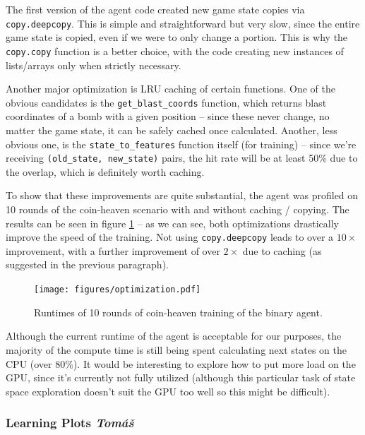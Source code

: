 \documentclass{article}
\begin{document}
The first version of the agent code created new game state copies via \texttt{copy.deepcopy}.
This is simple and straightforward but very slow, since the entire game state is copied, even if we were to only change a portion.
This is why the \texttt{copy.copy} function is a better choice, with the code creating new instances of lists/arrays only when strictly necessary.

Another major optimization is LRU caching of certain functions.
One of the obvious candidates is the \texttt{get\_blast\_coords} function, which returns blast coordinates of a bomb with a given position -- since these never change, no matter the game state, it can be safely cached once calculated.
Another, less obvious one, is the \texttt{state\_to\_features} function itself (for training) -- since we're receiving \texttt{(old\_state, new\_state)} pairs, the hit rate will be at least 50\% due to the overlap, which is definitely worth caching.

To show that these improvements are quite substantial, the agent was profiled on 10 rounds of the coin-heaven scenario with and without caching / copying.
The results can be seen in figure \ref{fig:optimization} -- as we can see, both optimizations drastically improve the speed of the training.
Not using \texttt{copy.deepcopy} leads to over a $10 \times$ improvement, with a further improvement of over $2 \times$ due to caching (as suggested in the previous paragraph).

\begin{figure}[h]
    \centering
    \texttt{[image: figures/optimization.pdf]}
    \caption{Runtimes of 10 rounds of coin-heaven training of the binary agent.}
    \label{fig:optimization}
\end{figure}

Although the current runtime of the agent is acceptable for our purposes, the majority of the compute time is still being spent calculating next states on the CPU (over 80\%).
It would be interesting to explore how to put more load on the GPU, since it's currently not fully utilized (although this particular task of state space exploration doesn't suit the GPU too well so this might be difficult).

\newpage

\subsubsection[Learning Plots]{Learning Plots {\normalsize \normalfont \it \hfill Tomáš}}
\end{document}
